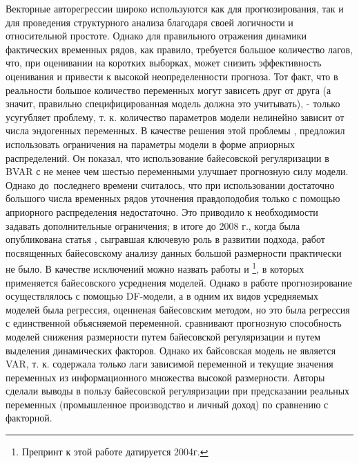 \documentclass[11pt]{article} %
\begin{document}
Векторные авторегрессии широко используются как для прогнозирования, так и для проведения структурного анализа благодаря своей логичности и относительной простоте. Однако для правильного отражения динамики фактических временных рядов, как правило, требуется большое количество лагов, что, при оценивании на коротких выборках, может снизить эффективность оценивания и привести к высокой неопределенности прогноза. Тот факт, что в реальности большое количество переменных могут зависеть друг от друга (а значит, правильно специфицированная модель должна это учитывать), - только усугубляет проблему, т. к. количество параметров модели нелинейно зависит от числа эндогенных переменных. В качестве решения этой проблемы \cite{litterman_1979}, предложил использовать ограничения на параметры модели в форме априорных распределений. Он показал, что использование байесовской регуляризации в  BVAR с  не менее  чем шестью переменными  улучшает прогнозную силу модели. Однако до~последнего времени считалось, что при использовании достаточно большого числа временных рядов уточнения правдоподобия только с помощью априорного распределения недостаточно.  Это приводило к необходимости задавать дополнительные ограничения; в итоге до 2008 г., когда была опубликована статья \cite{demol_al_2008}, сыгравшая ключевую роль в развитии подхода, работ посвященных байесовскому анализу данных большой размерности практически не было. 
В качестве исключений можно назвать работы \cite{koop_potter_2004} и \cite{wright_2009}\footnote{Препринт к этой работе датируется 2004г.}, в которых применяется байесовского усреднения моделей. Однако в работе \cite{koop_potter_2004} прогнозирование осуществлялось с помощью DF-модели, а в \cite{wright_2009} одним их видов усредняемых моделей была регрессия, оценненая байесовским методом, но это была регрессия с единственной объясняемой переменной. \cite{giacomini_white_2006} сравнивают прогнозную способность моделей снижения размерности путем байесовской регуляризации и путем выделения динамических факторов. Однако их байсовская модель не является VAR, т. к. содержала только лаги зависимой переменной и текущие значения переменных из информационного множества высокой размерности. Авторы сделали выводы в пользу байесовской регуляризации при предсказании реальных переменных (промышленное производство и личный доход) по сравнению с факторной. 
\end{document}
